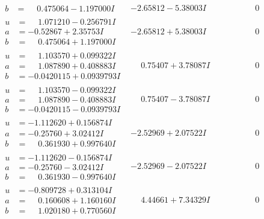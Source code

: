 \documentclass[1p]{elsarticle_modified}
\theoremstyle{definition}
\begin{document}
$$\begin{array}{c|c|c}
\begin{aligned}
b &= \phantom{-}0.475064 - 1.197000 I\end{aligned}
 & -2.65812 - 5.38003 I & \phantom{-0.000000 } 0 \\ \hline\begin{aligned}
u &= \phantom{-}1.071210 - 0.256791 I \\
a &= -0.52867 + 2.35753 I \\
b &= \phantom{-}0.475064 + 1.197000 I\end{aligned}
 & -2.65812 + 5.38003 I & \phantom{-0.000000 } 0 \\ \hline\begin{aligned}
u &= \phantom{-}1.103570 + 0.099322 I \\
a &= \phantom{-}1.087890 + 0.408883 I \\
b &= -0.0420115 + 0.0939793 I\end{aligned}
 & \phantom{-}0.75407 + 3.78087 I & \phantom{-0.000000 } 0 \\ \hline\begin{aligned}
u &= \phantom{-}1.103570 - 0.099322 I \\
a &= \phantom{-}1.087890 - 0.408883 I \\
b &= -0.0420115 - 0.0939793 I\end{aligned}
 & \phantom{-}0.75407 - 3.78087 I & \phantom{-0.000000 } 0 \\ \hline\begin{aligned}
u &= -1.112620 + 0.156874 I \\
a &= -0.25760 + 3.02412 I \\
b &= \phantom{-}0.361930 + 0.997640 I\end{aligned}
 & -2.52969 + 2.07522 I & \phantom{-0.000000 } 0 \\ \hline\begin{aligned}
u &= -1.112620 - 0.156874 I \\
a &= -0.25760 - 3.02412 I \\
b &= \phantom{-}0.361930 - 0.997640 I\end{aligned}
 & -2.52969 - 2.07522 I & \phantom{-0.000000 } 0 \\ \hline\begin{aligned}
u &= -0.809728 + 0.313104 I \\
a &= \phantom{-}0.160608 + 1.160160 I \\
b &= \phantom{-}1.020180 + 0.770560 I\end{aligned}
 & \phantom{-}4.44661 + 7.34329 I & \phantom{-0.000000 } 0 \\ \hline\begin{aligned}

\end{aligned}
\end{array}$$
\end{document}
